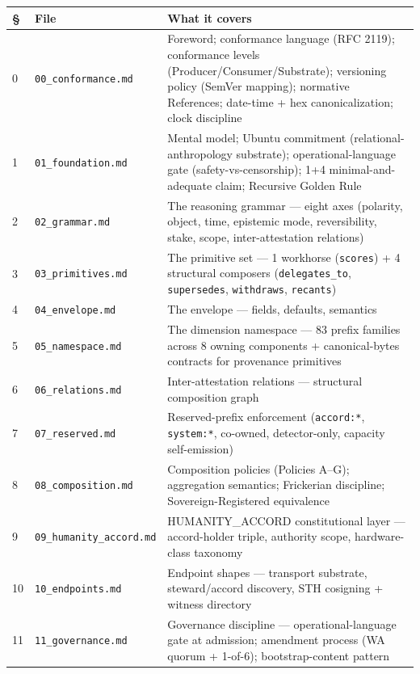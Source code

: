 \documentclass[11pt]{article}
\begin{document}
{\footnotesize
\begin{longtable}{|p{5.33cm}|p{5.33cm}|p{5.33cm}|}\hline
\textbf{§} & \textbf{File} & \textbf{What it covers} \\ \hline\endhead
0 & \texttt{00\_conformance.md} & Foreword; conformance language (RFC 2119); conformance levels (Producer/Consumer/Substrate); versioning policy (SemVer mapping); normative References; date-time + hex canonicalization; clock discipline \\ \hline
1 & \texttt{01\_foundation.md} & Mental model; Ubuntu commitment (relational-anthropology substrate); operational-language gate (safety-vs-censorship); 1+4 minimal-and-adequate claim; Recursive Golden Rule \\ \hline
2 & \texttt{02\_grammar.md} & The reasoning grammar — eight axes (polarity, object, time, epistemic mode, reversibility, stake, scope, inter-attestation relations) \\ \hline
3 & \texttt{03\_primitives.md} & The primitive set — 1 workhorse (\texttt{scores}) + 4 structural composers (\texttt{delegates\_to}, \texttt{supersedes}, \texttt{withdraws}, \texttt{recants}) \\ \hline
4 & \texttt{04\_envelope.md} & The envelope — fields, defaults, semantics \\ \hline
5 & \texttt{05\_namespace.md} & The dimension namespace — 83 prefix families across 8 owning components + canonical-bytes contracts for provenance primitives \\ \hline
6 & \texttt{06\_relations.md} & Inter-attestation relations — structural composition graph \\ \hline
7 & \texttt{07\_reserved.md} & Reserved-prefix enforcement (\texttt{accord:*}, \texttt{system:*}, co-owned, detector-only, capacity self-emission) \\ \hline
8 & \texttt{08\_composition.md} & Composition policies (Policies A–G); aggregation semantics; Frickerian discipline; Sovereign-Registered equivalence \\ \hline
9 & \texttt{09\_humanity\_accord.md} & HUMANITY\_ACCORD constitutional layer — accord-holder triple, authority scope, hardware-class taxonomy \\ \hline
10 & \texttt{10\_endpoints.md} & Endpoint shapes — transport substrate, steward/accord discovery, STH cosigning + witness directory \\ \hline
11 & \texttt{11\_governance.md} & Governance discipline — operational-language gate at admission; amendment process (WA quorum + 1-of-6); bootstrap-content pattern \\ \hline

\end{longtable}}
\end{document}
